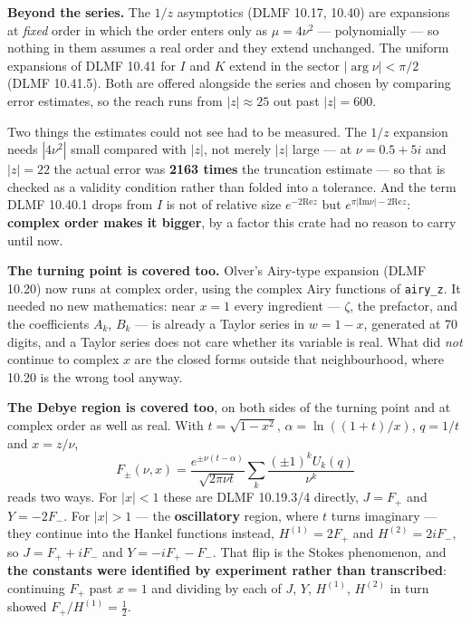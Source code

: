 \documentclass[11pt]{article}
\newcommand{\code}[1]{\texttt{#1}}
\begin{document}
\textbf{Beyond the series.} The $1/z$ asymptotics (DLMF 10.17, 10.40)
are expansions at \emph{fixed} order in which the order enters only as
$\mu = 4\nu^2$ --- polynomially --- so nothing in them assumes a real
order and they extend unchanged. The uniform expansions of DLMF 10.41
for $I$ and $K$ extend in the sector $|\arg\nu| < \pi/2$ (DLMF 10.41.5).
Both are offered alongside the series and chosen by comparing error
estimates, so the reach runs from $|z|\approx 25$ out past $|z| = 600$.

Two things the estimates could not see had to be measured. The $1/z$
expansion needs $|4\nu^2|$ small compared with $|z|$, not merely $|z|$
large --- at $\nu = 0.5+5i$ and $|z| = 22$ the actual error was
\textbf{2163 times} the truncation estimate --- so that is checked as a
validity condition rather than folded into a tolerance. And the term
DLMF 10.40.1 drops from $I$ is not of relative size $e^{-2\mathrm{Re}z}$
but $e^{\pi|\mathrm{Im}\nu| - 2\mathrm{Re}z}$: \textbf{complex order
makes it bigger}, by a factor this crate had no reason to carry until
now.

\textbf{The turning point is covered too.} Olver's Airy-type expansion
(DLMF 10.20) now runs at complex order, using the complex Airy functions
of \code{airy\_z}. It needed no new mathematics: near $x = 1$ every
ingredient --- $\zeta$, the prefactor, and the coefficients $A_k$, $B_k$
--- is already a Taylor series in $w = 1-x$, generated at 70 digits, and
a Taylor series does not care whether its variable is real. What did
\emph{not} continue to complex $x$ are the closed forms outside that
neighbourhood, where 10.20 is the wrong tool anyway.

\textbf{The Debye region is covered too}, on both sides of the turning
point and at complex order as well as real. With $t = \sqrt{1-x^2}$,
$\alpha = \ln((1+t)/x)$, $q = 1/t$ and $x = z/\nu$,
\[
  F_\pm(\nu,x) = \frac{e^{\pm\nu(t-\alpha)}}{\sqrt{2\pi\nu t}}
    \sum_k \frac{(\pm1)^k U_k(q)}{\nu^k}
\]
reads two ways. For $|x| < 1$ these are DLMF 10.19.3/4 directly,
$J = F_+$ and $Y = -2F_-$. For $|x| > 1$ --- the \textbf{oscillatory}
region, where $t$ turns imaginary --- they continue into the Hankel
functions instead, $H^{(1)} = 2F_+$ and $H^{(2)} = 2iF_-$, so
$J = F_+ + iF_-$ and $Y = -iF_+ - F_-$. That flip is the Stokes
phenomenon, and \textbf{the constants were identified by experiment
rather than transcribed}: continuing $F_+$ past $x = 1$ and dividing by
each of $J$, $Y$, $H^{(1)}$, $H^{(2)}$ in turn showed
$F_+/H^{(1)} = \tfrac12$.
\end{document}
